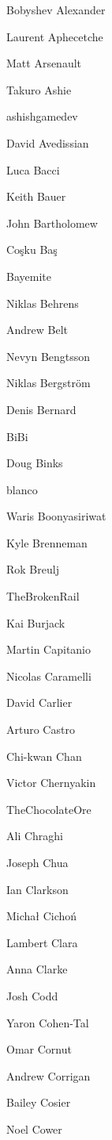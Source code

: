 \begin{DoxyItemize}
\item Bobyshev Alexander
\item Laurent Aphecetche
\item Matt Arsenault
\item Takuro Ashie
\item ashishgamedev
\item David Avedissian
\item Luca Bacci
\item Keith Bauer
\item John Bartholomew
\item Coşku Baş
\item Bayemite
\item Niklas Behrens
\item Andrew Belt
\item Nevyn Bengtsson
\item Niklas Bergström
\item Denis Bernard
\item Bi\+Bi
\item Doug Binks
\item blanco
\item Waris Boonyasiriwat
\item Kyle Brenneman
\item Rok Breulj
\item The\+Broken\+Rail
\item Kai Burjack
\item Martin Capitanio
\item Nicolas Caramelli
\item David Carlier
\item Arturo Castro
\item Chi-\/kwan Chan
\item Victor Chernyakin
\item The\+Chocolate\+Ore
\item Ali Chraghi
\item Joseph Chua
\item Ian Clarkson
\item Michał Cichoń
\item Lambert Clara
\item Anna Clarke
\item Josh Codd
\item Yaron Cohen-\/\+Tal
\item Omar Cornut
\item Andrew Corrigan
\item Bailey Cosier
\item Noel Cower

\end{DoxyItemize}
